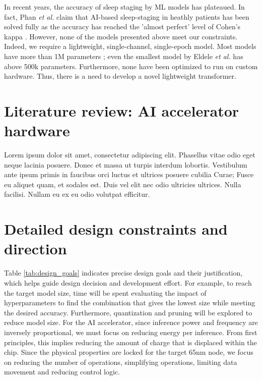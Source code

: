 \documentclass[12pt]{article}
\begin{document}
    In recent years, the accuracy of sleep staging by ML models has plateaued. In fact, Phan \textit{et al.} claim that AI-based sleep-staging in heathly patients has been solved fully as the accuracy has reached the 'almost perfect' level of Cohen's kappa \cite{phan2022automatic}. However, none of the models presented above meet
    our constraints. Indeed, we require a lightweight, single-channel, single-epoch model. Most models have more than 1M parameters \cite{phan2022sleeptransformer}; even the smallest model by Eldele \textit{et al.} has above 500k parameters. Furthermore, none have been optimized to run on custom hardware. Thus, there is a need to develop a novel
    lightweight transformer.

    \section{Literature review: AI accelerator hardware}
    Lorem ipsum dolor sit amet, consectetur adipiscing elit. Phasellus vitae odio eget neque lacinia posuere. Donec et massa ut turpis interdum lobortis. Vestibulum ante ipsum primis
    in faucibus orci luctus et ultrices posuere cubilia Curae; Fusce eu aliquet quam, et sodales est. Duis vel elit nec odio ultricies ultrices. Nulla facilisi. Nullam eu ex eu odio volutpat efficitur.

    \section{Detailed design constraints and direction}
    Table \ref{tab:design_goals} indicates precise design goals and their justification, which helps guide design decision and development effort. For example, to reach the target model size, time will be spent evaluating
    the impact of hyperparameters to find the combination that gives the lowest size while meeting the desired accuracy. Furthermore, quantization and pruning will be explored to reduce model size. For the AI accelerator, 
    since inference power and frequency are inversely proportional, we must focus on reducing energy per inference. From first principles, this implies reducing the amount of charge that is displaced within the chip. Since
    the physical properties are locked for the target 65nm node, we focus on reducing the number of operations, simplifying operations, limiting data movement and reducing control logic.
\end{document}
